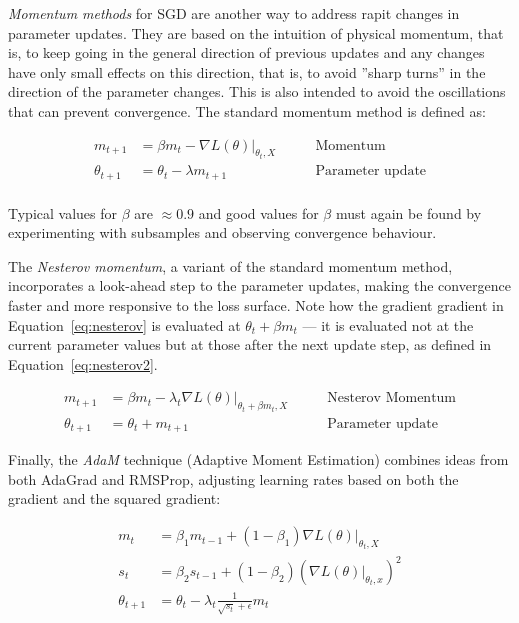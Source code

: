 \emph{Momentum methods} for SGD are another way to address rapit changes in parameter updates. They are based on the intuition of physical momentum, that is, to keep going in the general direction of previous updates and any changes have only small effects on this direction, that is, to avoid ''sharp turns'' in the direction of the parameter changes. This is also intended to avoid the oscillations that can prevent convergence. The standard momentum method is defined as:

\begin{align*}
m_{t+1} &= \beta m_{t} - \nabla L(\theta) \rvert_{\theta_t, X} &\qquad \text{Momentum} \\
\theta_{t+1} &= \theta_{t} - \lambda m_{t+1} &\qquad \text{Parameter update} \\
\end{align*}

Typical values for $\beta$ are $\approx 0.9$ and good values for $\beta$ must again be found by experimenting with subsamples and observing convergence behaviour. 

The \emph{Nesterov momentum}, a variant of the standard momentum method, incorporates a look-ahead step to the parameter updates, making the convergence faster and more responsive to the loss surface. Note how the gradient gradient in Equation~\ref{eq:nesterov} is evaluated at $\theta_t + \beta m_t$ --- it is evaluated not at the current parameter values but at those after the next update step, as defined in Equation~\ref{eq:nesterov2}. 

\begin{align}
m_{t+1} &= \beta m_{t} - \lambda_t \nabla L(\theta) \rvert_{\theta_{t}+\beta m_{t}, X} &\qquad \text{Nesterov Momentum} \label{eq:nesterov} \\
\theta_{t+1} &= \theta_{t} + m_{t+1} &\qquad \text{Parameter update} \label{eq:nesterov2}
\end{align}

Finally, the \emph{AdaM} technique (Adaptive Moment Estimation) combines ideas from both AdaGrad and RMSProp, adjusting learning rates based on both the gradient and the squared gradient:

\begin{align}
m_t &= \beta_1 m_{t-1} + (1-\beta_1) \nabla L(\theta)\rvert_{\theta_t, X}  \label{eq:adam1} \\ 
s_t &= \beta_2 s_{t-1} + (1-\beta_2) \left( \nabla L(\theta)\vert_{\theta_t, x} \right)^2 \label{eq:adam2} \\
\theta_{t+1} &= \theta_t - \lambda_t \frac{1}{\sqrt{s_t}+\epsilon} m_t \label{eq:adam3} 
\end{align}


